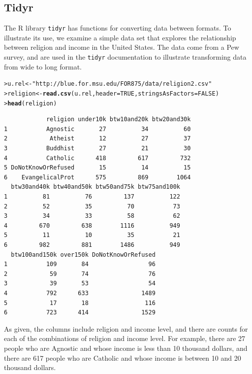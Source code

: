 \documentclass[12pt,oneside]{book}\usepackage[]{graphicx}\usepackage[]{color}
\makeatletter
\newcommand{\hlnum}[1]{\textcolor[rgb]{0.686,0.059,0.569}{#1}}%
\newcommand{\hlstr}[1]{\textcolor[rgb]{0.192,0.494,0.8}{#1}}%
\newcommand{\hlstd}[1]{\textcolor[rgb]{0.345,0.345,0.345}{#1}}%
\newcommand{\hlkwb}[1]{\textcolor[rgb]{0.69,0.353,0.396}{#1}}%
\newcommand{\hlkwc}[1]{\textcolor[rgb]{0.333,0.667,0.333}{#1}}%
\newcommand{\hlkwd}[1]{\textcolor[rgb]{0.737,0.353,0.396}{\textbf{#1}}}%
\newenvironment{kframe}{%
 \def\at@end@of@kframe{}%
 \ifinner\ifhmode%
  \def\at@end@of@kframe{\end{minipage}}%
  \begin{minipage}{\columnwidth}%
 \fi\fi%
 \def\FrameCommand##1{\hskip\@totalleftmargin \hskip-\fboxsep
 \colorbox{shadecolor}{##1}\hskip-\fboxsep
     \hskip-\linewidth \hskip-\@totalleftmargin \hskip\columnwidth}%
 \MakeFramed {\advance\hsize-\width
   \@totalleftmargin\z@ \linewidth\hsize
   \@setminipage}}%
 {\par\unskip\endMakeFramed%
 \at@end@of@kframe}
\newenvironment{knitrout}{}{} %
\makeatother
\begin{document}
\subsection{Tidyr}
The R library \verb+tidyr+ has functions for converting data between formats. To illustrate its use, we examine a simple data set that explores the relationship between religion and income in the United States. The data come from a Pew survey, and are used in the \verb+tidyr+ documentation to illustrate transforming data from wide to long format. 

\begin{knitrout}
\color{fgcolor}\begin{kframe}
\begin{alltt}
\hlstd{> }\hlstd{u.rel} \hlkwb{<-} \hlstr{"http://blue.for.msu.edu/FOR875/data/religion2.csv"}
\hlstd{> }\hlstd{religion} \hlkwb{<-} \hlkwd{read.csv}\hlstd{(u.rel,} \hlkwc{header} \hlstd{=} \hlnum{TRUE}\hlstd{,} \hlkwc{stringsAsFactors} \hlstd{=} \hlnum{FALSE}\hlstd{)}
\hlstd{> }\hlkwd{head}\hlstd{(religion)}
\end{alltt}
\begin{verbatim}
            religion under10k btw10and20k btw20and30k
1           Agnostic       27          34          60
2            Atheist       12          27          37
3           Buddhist       27          21          30
4           Catholic      418         617         732
5 DoNotKnowOrRefused       15          14          15
6    EvangelicalProt      575         869        1064
  btw30and40k btw40and50k btw50and75k btw75and100k
1          81          76         137          122
2          52          35          70           73
3          34          33          58           62
4         670         638        1116          949
5          11          10          35           21
6         982         881        1486          949
  btw100and150k over150k DoNotKnowOrRefused
1           109       84                 96
2            59       74                 76
3            39       53                 54
4           792      633               1489
5            17       18                116
6           723      414               1529
\end{verbatim}
\end{kframe}
\end{knitrout}

As given, the columns include religion and income level, and there are counts for each of the combinations of religion and income level. For example, there are 27 people who are Agnostic and whose income is less than 10 thousand dollars, and there are 617 people who are Catholic and whose income is between 10 and 20 thousand dollars.
\end{document}
